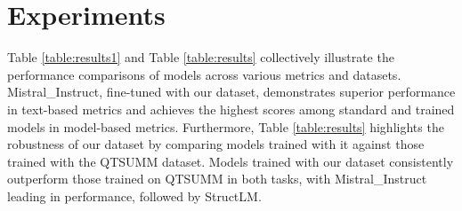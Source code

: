 \section{Experiments}
Table \ref{table:results1} and Table \ref{table:results} collectively illustrate the performance comparisons of models across various metrics and datasets. Mistral\_Instruct, fine-tuned with our dataset, demonstrates superior performance in text-based metrics and achieves the highest scores among standard and trained models in model-based metrics. Furthermore, Table \ref{table:results} highlights the robustness of our dataset by comparing models trained with it against those trained with the QTSUMM dataset. Models trained with our dataset consistently outperform those trained on QTSUMM in both tasks, with Mistral\_Instruct leading in performance, followed by StructLM.

